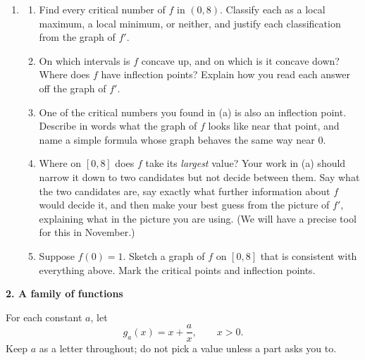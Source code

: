 \documentclass[11pt]{article}
\newcommand{\prob}[1]{\medskip\noindent\textbf{\large #1}\par\smallskip}
\begin{document}
\begin{enumerate}[resume]
\item[]
\begin{enumerate}
\item Find every critical number of $f$ in $(0,8)$. Classify each as a local maximum, a
local minimum, or neither, and justify each classification from the graph of $f'$.

\item On which intervals is $f$ concave up, and on which is it concave down? Where does
$f$ have inflection points? Explain how you read each answer off the graph of $f'$.

\item One of the critical numbers you found in (a) is also an inflection point. Describe
in words what the graph of $f$ looks like near that point, and name a simple formula
whose graph behaves the same way near $0$.

\item Where on $[0,8]$ does $f$ take its \emph{largest} value? Your work in (a) should
narrow it down to two candidates but not decide between them. Say what the two
candidates are, say exactly what further information about $f$ would decide it, and then
make your best guess from the picture of $f'$, explaining what in the picture you are
using. (We will have a precise tool for this in November.)

\item Suppose $f(0)=1$. Sketch a graph of $f$ on $[0,8]$ that is consistent with
everything above. Mark the critical points and inflection points.
\end{enumerate}
\end{enumerate}

\newpage
\prob{2. A family of functions}

For each constant $a$, let
\[
g_a(x) = x + \frac{a}{x}, \qquad x > 0 .
\]
Keep $a$ as a letter throughout; do not pick a value unless a part asks you to.
\end{document}
